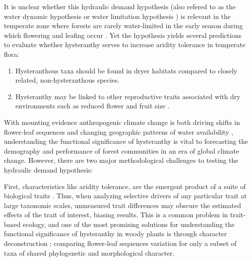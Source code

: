 \documentclass{article}[11pt]
\begin{document}
It is unclear whether this hydraulic demand hypothesis (also refered to as the water dynamic hypothesis \citep{Gougherty2018} or water limitation hypothesis \citep{Buonaiuto2020}) is relevant in the temperate zone where forests are rarely water-limited in the early season during which flowering and leafing occur \citep{Polgar2011}.%
Yet the hypothesis yields several predictions to evaluate whether hysteranthy serves to increase aridity tolerance in temperate flora:
\begin{enumerate}
\item Hysteranthous taxa should be found in dryer habitats compared to closely related, non-hysteranthous species.
\item Hysteranthy may be linked to other reproductive traits associated with dry environments such as reduced flower and fruit size \citep{Herrera:2009aa,Liu:2013ua}.
\end{enumerate}
\noindent With mounting evidence anthropogenic climate change is both driving shifts in flower-leaf sequences \citep{Ma2020:aa} and changing geographic patterns of water availability \citep{Overpeck11856}, understanding the functional significance of hysteranthy is vital to forecasting the demography and performance of forest communities in an era of global climate change. However, there are two major methodological challenges to testing the hydraulic demand hypothesis:

\noindent First, characteristics like aridity tolerance, are the emergent product of a suite of biological traits \citep{Simova:2017vk}. Thus, when analyzing selective drivers of any particular trait at large taxonomic scales, unmeasured trait differences may obscure the estimated effects of the trait of interest, biasing results. This is a common problem in trait-based ecology, and one of the most promising solutions for understanding the functional significance of hysteranthy in woody plants is through character deconstruction \citep{Terribile2009}; comparing flower-leaf sequences variation for only a subset of taxa of shared phylogenetic and morphological character.   
\end{document}
